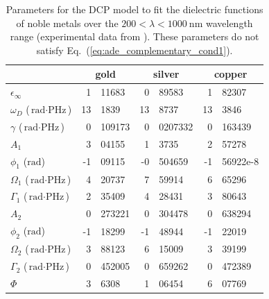 \begin{table}[hp!]
  \centering 
  \begin{tabular}{lr@{.}lr@{.}lr@{.}l}
    \hline
    & \multicolumn{2}{c}{gold} & \multicolumn{2}{c}{silver} & \multicolumn{2}{c}{copper} \\
    \hline
    \hline
    $\epsilon_\infty$                             & 1&11683  & 0&89583   & 1&82307    \\
    $\omega_D$ ($\textrm{rad}\cdot\textrm{PHz}$) & 13&1839  & 13&8737   & 13&3846     \\
    $\gamma$ ($\textrm{rad}\cdot\textrm{PHz}$)   & 0&109173 & 0&0207332 & 0&163439    \\
    $A_1$                                        & 3&04155  & 1&3735    & 2&57278     \\
    $\phi_1$ ($\textrm{rad}$)                    & -1&09115 & -0&504659 & -1&56922e-8 \\
    $\Omega_1$ ($\textrm{rad}\cdot\textrm{PHz}$) & 4&20737  & 7&59914   & 6&65296     \\
    $\Gamma_1$ ($\textrm{rad}\cdot\textrm{PHz}$) & 2&35409  & 4&28431   & 3&80643     \\
    $A_2$                                        & 0&273221 & 0&304478  & 0&638294    \\
    $\phi_2$ ($\textrm{rad}$)                    & -1&18299 & -1&48944  & -1&22019    \\
    $\Omega_2$ ($\textrm{rad}\cdot\textrm{PHz}$) & 3&88123  & 6&15009   & 3&39199     \\
    $\Gamma_2$ ($\textrm{rad}\cdot\textrm{PHz}$) & 0&452005 & 0&659262  & 0&472389    \\
    \hline
    $\Phi$                                       & 3&6308   & 1&06454   & 6&07769     \\
    \hline
  \end{tabular}
  \caption{Parameters for the DCP model to fit the dielectric functions of noble metals over the $200<\lambda<1000~\textrm{nm}$ wavelength range (experimental data from \citet{johnson_optical_1972}). These parameters do not satisfy Eq.~(\ref{eq:ade_complementary_cond1}).}
  \label{tab:dcp_param}
\end{table}

